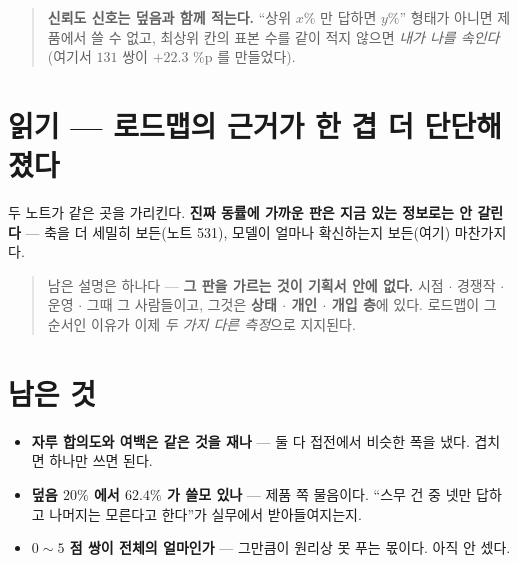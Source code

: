 \documentclass[11pt]{article}
\begin{document}
\begin{quote}
\textbf{신뢰도 신호는 덮음과 함께 적는다.} ``상위 $x\%$ 만 답하면 $y\%$''
형태가 아니면 제품에서 쓸 수 없고, 최상위 칸의 표본 수를 같이 적지 않으면
\emph{내가 나를 속인다}(여기서 $131$ 쌍이 $+22.3$ \%p 를 만들었다).
\end{quote}

\section*{읽기 --- 로드맵의 근거가 한 겹 더 단단해졌다}

두 노트가 같은 곳을 가리킨다. \textbf{진짜 동률에 가까운 판은 지금 있는
정보로는 안 갈린다} --- 축을 더 세밀히 보든(노트 531), 모델이 얼마나 확신하는지
보든(여기) 마찬가지다.

\begin{quote}
남은 설명은 하나다 --- \textbf{그 판을 가르는 것이 기획서 안에 없다.}
시점 $\cdot$ 경쟁작 $\cdot$ 운영 $\cdot$ 그때 그 사람들이고, 그것은
\textbf{상태 $\cdot$ 개인 $\cdot$ 개입 층}에 있다. 로드맵이 그 순서인 이유가
이제 \emph{두 가지 다른 측정}으로 지지된다.
\end{quote}

\section*{남은 것}

\begin{itemize}
\item \textbf{자루 합의도와 여백은 같은 것을 재나} --- 둘 다 접전에서 비슷한
폭을 냈다. 겹치면 하나만 쓰면 된다.
\item \textbf{덮음 $20\%$ 에서 $62.4\%$ 가 쓸모 있나} --- 제품 쪽 물음이다.
``스무 건 중 넷만 답하고 나머지는 모른다고 한다''가 실무에서 받아들여지는지.
\item \textbf{$0\!\sim\!5$ 점 쌍이 전체의 얼마인가} --- 그만큼이 원리상
못 푸는 몫이다. 아직 안 셌다.
\end{itemize}
\end{document}

